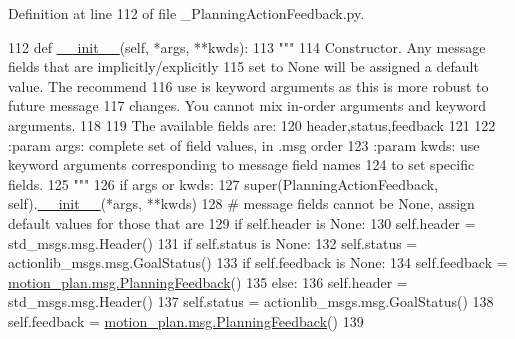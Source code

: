 Definition at line 112 of file \+\_\+\+Planning\+Action\+Feedback.\+py.


\begin{DoxyCode}
112   \textcolor{keyword}{def }\hyperlink{classstate__machine_1_1Play_a5993a23d8be7f7b2647f71ede0334957}{\_\_init\_\_}(self, *args, **kwds):
113     \textcolor{stringliteral}{"""}
114 \textcolor{stringliteral}{    Constructor. Any message fields that are implicitly/explicitly}
115 \textcolor{stringliteral}{    set to None will be assigned a default value. The recommend}
116 \textcolor{stringliteral}{    use is keyword arguments as this is more robust to future message}
117 \textcolor{stringliteral}{    changes.  You cannot mix in-order arguments and keyword arguments.}
118 \textcolor{stringliteral}{}
119 \textcolor{stringliteral}{    The available fields are:}
120 \textcolor{stringliteral}{       header,status,feedback}
121 \textcolor{stringliteral}{}
122 \textcolor{stringliteral}{    :param args: complete set of field values, in .msg order}
123 \textcolor{stringliteral}{    :param kwds: use keyword arguments corresponding to message field names}
124 \textcolor{stringliteral}{    to set specific fields.}
125 \textcolor{stringliteral}{    """}
126     \textcolor{keywordflow}{if} args \textcolor{keywordflow}{or} kwds:
127       super(PlanningActionFeedback, self).\hyperlink{classstate__machine_1_1Play_a5993a23d8be7f7b2647f71ede0334957}{\_\_init\_\_}(*args, **kwds)
128       \textcolor{comment}{# message fields cannot be None, assign default values for those that are}
129       \textcolor{keywordflow}{if} self.header \textcolor{keywordflow}{is} \textcolor{keywordtype}{None}:
130         self.header = std\_msgs.msg.Header()
131       \textcolor{keywordflow}{if} self.status \textcolor{keywordflow}{is} \textcolor{keywordtype}{None}:
132         self.status = actionlib\_msgs.msg.GoalStatus()
133       \textcolor{keywordflow}{if} self.feedback \textcolor{keywordflow}{is} \textcolor{keywordtype}{None}:
134         self.feedback = \hyperlink{classmotion__plan_1_1msg_1_1__PlanningFeedback_1_1PlanningFeedback}{motion\_plan.msg.PlanningFeedback}()
135     \textcolor{keywordflow}{else}:
136       self.header = std\_msgs.msg.Header()
137       self.status = actionlib\_msgs.msg.GoalStatus()
138       self.feedback = \hyperlink{classmotion__plan_1_1msg_1_1__PlanningFeedback_1_1PlanningFeedback}{motion\_plan.msg.PlanningFeedback}()
139 
\end{DoxyCode}


